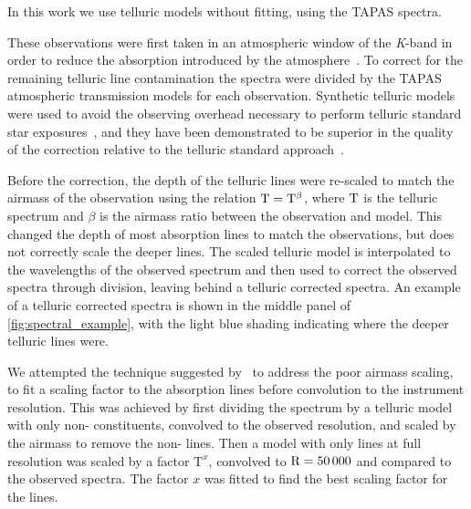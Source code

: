 In this work we use telluric models without fitting, using the {TAPAS} spectra.

These observations were first taken in an atmospheric window of the \emph{K}-band in order to reduce the absorption introduced by the atmosphere~\citep{barnes_hd_2008}.
 To correct for the remaining telluric line contamination the spectra were divided by the {TAPAS}\citep{bertaux_tapas_2014} atmospheric transmission models for each observation.
Synthetic telluric models were used to avoid the observing overhead necessary to perform telluric standard star exposures~\citep{vacca_method_2003}, and they have been demonstrated to be superior in the quality of the correction relative to the telluric standard approach~\citep[e.g.][]{cotton_atmospheric_2014}.

Before the correction, the depth of the telluric lines were re-scaled to match the airmass of the observation using the relation \(\rm T = T^{\beta}\), where \(\rm T\) is the telluric spectrum and \(\beta\) is the airmass ratio between the observation and model.
This changed the depth of most absorption lines to match the observations, but does not correctly scale the deeper  lines.
The scaled telluric model is interpolated to the wavelengths of the observed spectrum and then used to correct the observed spectra through division, leaving behind a telluric corrected spectra.
An example of a telluric corrected spectra is shown in the middle panel of \cref{fig:spectral_example}, with the light blue shading indicating where the deeper telluric lines were.

We attempted the technique suggested by~\citet{bertaux_tapas_2014} to address the poor  airmass scaling, to fit a scaling factor to the   absorption lines before convolution to the instrument resolution.
This was achieved by first dividing the spectrum by a telluric model with only non- constituents, convolved to the observed resolution, and scaled by the airmass to remove the non- lines.
Then a model with only  lines at full resolution was scaled by a factor \(\textrm{T}^{x}\), convolved to \(\rm R=50\,000\) and compared to the observed spectra.
The factor \(x\) was fitted to find the best scaling factor for the  lines.

